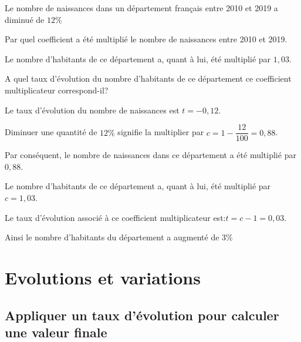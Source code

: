 \documentclass[11pt,a4paper]{book}
\begin{document}
\begin{bmethode}
    
    Le nombre de naissances dans un département français entre 2010 et 2019 a diminué de $12\%$
    \begin{enumMet}
        \item Par quel coefficient a été multiplié le nombre de naissances entre 2010 et 2019.
        \item Le nombre d'habitants de ce département a, quant à lui, été multiplié par $1,03$.
        
        A quel taux d'évolution du nombre d'habitants de ce département ce coefficient multiplicateur correspond-il?
    \end{enumMet}
    
    \begin{enumMet}
        \item Le taux d'évolution du nombre de naissances est $t=-0,12$.
        
        Diminuer une quantité de $12\%$ signifie la multiplier par $c=1-\dfrac{12}{100}=0,88$.
        
        Par conséquent, le nombre de naissances dans ce département a été multiplié par $0,88$.
        \item Le nombre d'habitants de ce département a, quant à lui, été multiplié par $c=1,03$.
        
        Le taux d'évolution associé à ce coefficient multiplicateur est:$t=c-1=0,03$.
        
        Ainsi le nombre d'habitants du département a augmenté de $3\%$
    \end{enumMet}
\end{bmethode}

\section{Evolutions et variations}

\subsection{Appliquer un taux d'évolution pour calculer une valeur finale}
\end{document}
